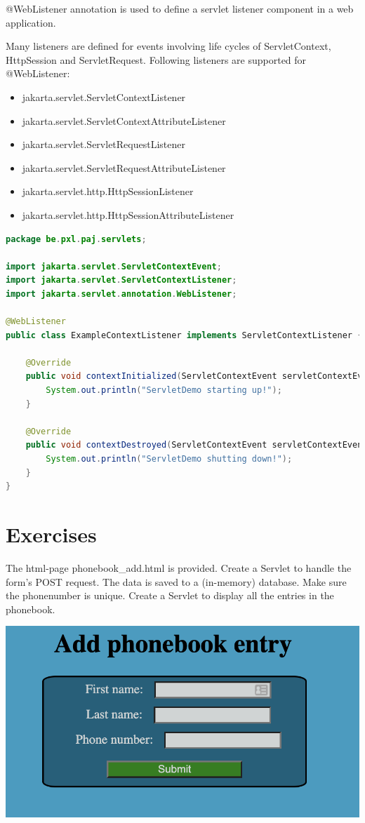 @WebListener annotation is used to define a servlet listener component in a web application.

Many listeners are defined for events involving life cycles of ServletContext, HttpSession and ServletRequest.  Following listeners are supported for @WebListener:

\begin{itemize}
\item jakarta.servlet.ServletContextListener
\item jakarta.servlet.ServletContextAttributeListener
\item jakarta.servlet.ServletRequestListener
\item jakarta.servlet.ServletRequestAttributeListener
\item jakarta.servlet.http.HttpSessionListener
\item jakarta.servlet.http.HttpSessionAttributeListener
\end{itemize}


\begin{lstlisting}[language=java, frame=single]
package be.pxl.paj.servlets;

import jakarta.servlet.ServletContextEvent;
import jakarta.servlet.ServletContextListener;
import jakarta.servlet.annotation.WebListener;

@WebListener
public class ExampleContextListener implements ServletContextListener {

	@Override
	public void contextInitialized(ServletContextEvent servletContextEvent) {
		System.out.println("ServletDemo starting up!");
	}

	@Override
	public void contextDestroyed(ServletContextEvent servletContextEvent) {
		System.out.println("ServletDemo shutting down!");
	}
}
\end{lstlisting}

\section{Exercises}

\begin{oefening}
The html-page phonebook\_add.html is provided. Create a Servlet to handle the form’s POST request. The data is saved to a (in-memory) database. Make sure the phonenumber is unique.  Create a Servlet to display all the entries in the phonebook. 
\end{oefening}

\includegraphics{./images/chapter8/add_phonebook_entry}

